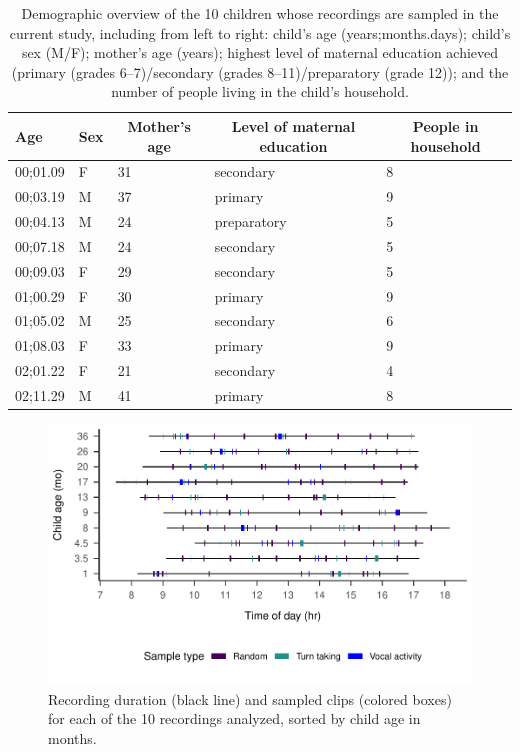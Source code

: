 \documentclass[
  english,
  ,man,floatsintext]{apa6}
\begin{document}
\begin{table}[tbp]

\begin{center}
\begin{threeparttable}

\caption{\label{tab:tab1}Demographic overview of the 10 children whose recordings are sampled in the current study, including from left to right: child's age (years;months.days); child's sex (M/F); mother's age (years); highest level of maternal education achieved (primary (grades 6--7)/secondary (grades 8--11)/preparatory (grade 12)); and the number of people living in the child's household.}

\begin{tabular}{lllll}
\toprule
Age & \multicolumn{1}{c}{Sex} & \multicolumn{1}{c}{Mother's age} & \multicolumn{1}{c}{Level of maternal education} & \multicolumn{1}{c}{People in household}\\
\midrule
00;01.09 & F & 31 & secondary & 8\\
00;03.19 & M & 37 & primary & 9\\
00;04.13 & M & 24 & preparatory & 5\\
00;07.18 & M & 24 & secondary & 5\\
00;09.03 & F & 29 & secondary & 5\\
01;00.29 & F & 30 & primary & 9\\
01;05.02 & M & 25 & secondary & 6\\
01;08.03 & F & 33 & primary & 9\\
02;01.22 & F & 21 & secondary & 4\\
02;11.29 & M & 41 & primary & 8\\
\bottomrule
\end{tabular}

\end{threeparttable}
\end{center}

\end{table}

\begin{figure}
\centering
\includegraphics{Yeli-CLE_files/figure-latex/fig1-1.pdf}
\caption{\label{fig:fig1}Recording duration (black line) and sampled clips (colored boxes) for each of the 10 recordings analyzed, sorted by child age in months.}
\end{figure}
\end{document}
